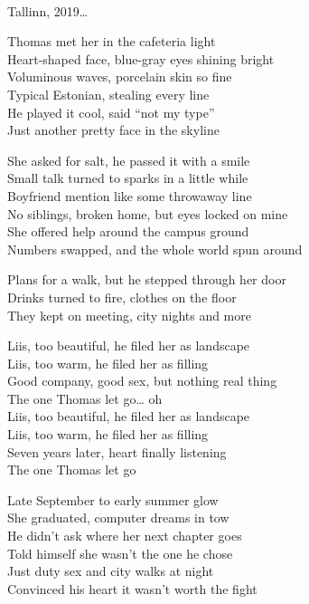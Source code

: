\begin{lyrics}
\\
Tallinn, 2019…

Thomas met her in the cafeteria light\\
Heart-shaped face, blue-gray eyes shining bright\\
Voluminous waves, porcelain skin so fine\\
Typical Estonian, stealing every line\\
He played it cool, said “not my type”\\
Just another pretty face in the skyline

She asked for salt, he passed it with a smile\\
Small talk turned to sparks in a little while\\
Boyfriend mention like some throwaway line\\
No siblings, broken home, but eyes locked on mine\\
She offered help around the campus ground\\
Numbers swapped, and the whole world spun around

Plans for a walk, but he stepped through her door\\
Drinks turned to fire, clothes on the floor\\
They kept on meeting, city nights and more

Liis, too beautiful, he filed her as landscape\\
Liis, too warm, he filed her as filling\\
Good company, good sex, but nothing real thing\\
The one Thomas let go… oh\\
Liis, too beautiful, he filed her as landscape\\
Liis, too warm, he filed her as filling\\
Seven years later, heart finally listening\\
The one Thomas let go

Late September to early summer glow\\
She graduated, computer dreams in tow\\
He didn’t ask where her next chapter goes\\
Told himself she wasn’t the one he chose\\
Just duty sex and city walks at night\\
Convinced his heart it wasn’t worth the fight


\end{lyrics}
